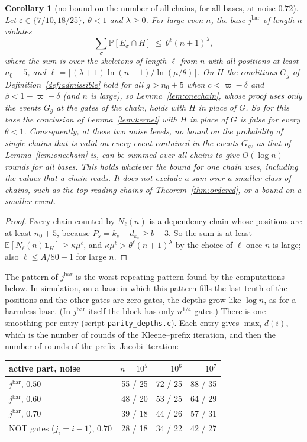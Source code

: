 \documentclass[11pt]{amsart}
\newtheorem{corollary}[theorem]{Corollary}
\theoremstyle{definition}
\theoremstyle{remark}
\newcommand{\eps}{\varepsilon}
\newcommand{\PP}{\mathbb{P}}
\newcommand{\EE}{\mathbb{E}}
\begin{document}
\begin{corollary}[no bound on the number of all chains, for all bases, at noise $0.72$]\label{cor:barrier}
Let $\eps\in\{7/10,18/25\}$, $\theta<1$ and $\lambda\ge0$. For large even $n$, the base
$j^{\mathrm{bar}}$ of length $n$ violates
\[
\sum_\sigma\PP[E_\sigma\cap H]\ \le\ \theta^\ell(n+1)^\lambda ,
\]
where the sum is over the skeletons of length $\ell$ from $n$ with all positions at least
$n_0+5$, and $\ell=\lceil(\lambda+1)\ln(n+1)/\ln(\mu/\theta)\rceil$. On $H$ the conditions $G_g$
of Definition~\ref{def:admissible} hold for all $g>n_0+5$ when $c<\varpi-\delta$ and
$\beta<1-\varpi-\delta$ (and $n$ is large), so Lemma~\ref{lem:onechain}, whose proof uses only the
events $G_g$ at the gates of the chain, holds with $H$ in place of $G$. So for this base the
conclusion of Lemma~\ref{lem:kernel} with $H$ in place of $G$ is false for every $\theta<1$.
Consequently, at these two noise levels, no bound on the probability of single chains that is
valid on every event contained in the events $G_g$, as that of Lemma~\ref{lem:onechain} is, can be
summed over \emph{all} chains to give $O(\log n)$ rounds for all bases. This holds whatever the
bound for one chain uses, including the values that a chain reads. It does not exclude a sum over
a smaller class of chains, such as the top-reading chains of Theorem~\ref{thm:ordered}, or a bound
on a smaller event.
\end{corollary}

\begin{proof}
Every chain counted by $N_\ell(n)$ is a dependency chain whose positions are at least $n_0+5$,
because $P_s=k_s-d_{k_s}\ge b-3$. So the sum is at least
$\EE[N_\ell(n)\mathbf 1_H]\ge\kappa\mu^\ell$, and $\kappa\mu^\ell>\theta^\ell(n+1)^\lambda$ by the
choice of $\ell$ once $n$ is large; also $\ell\le A/80-1$ for large $n$.
\end{proof}

\noindent The pattern of $j^{\mathrm{bar}}$ is the worst repeating pattern found by the
computations below. In simulation, on a base in which this pattern fills the last tenth of the
positions and the other gates are zero gates, the depths grow like $\log n$, as for a harmless
base. (In $j^{\mathrm{bar}}$ itself the block has only $n^{1/4}$ gates.) There is one smoothing per
entry (script \texttt{parity\_depths.c}). Each entry gives $\max_id(i)$, which is the number of rounds of the
Kleene--prefix iteration, and then the number of rounds of the prefix--Jacobi iteration:

\begin{center}
\begin{tabular}{lrrr}
\toprule
active part, noise & $n=10^5$ & $10^6$ & $10^7$\\
\midrule
$j^{\mathrm{bar}}$, $0.50$ & 55 / 25 & 72 / 25 & 88 / 35\\
$j^{\mathrm{bar}}$, $0.60$ & 48 / 20 & 53 / 25 & 64 / 29\\
$j^{\mathrm{bar}}$, $0.70$ & 39 / 18 & 44 / 26 & 57 / 31\\
NOT gates ($j_i=i-1$), $0.70$ & 28 / 18 & 34 / 22 & 42 / 27\\
\bottomrule
\end{tabular}
\end{center}
\end{document}
